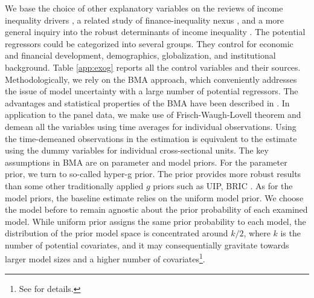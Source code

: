 \documentclass[preprint, nonatbib, 10pt]{elsarticle}
\begin{document}

We base the choice of other explanatory variables on the reviews of income inequality drivers \parencite{roineetal2009,nolan2019drivers}, a related study of finance-inequality nexus \parencite{de2017finance}, and a more general inquiry into the robust determinants of income inequality \parencite{furceri2019robust}. The potential regressors could be categorized into several groups. They control for economic and financial development, demographics, globalization, and institutional background. Table \ref{app:exog} reports all the control variables and their sources. 
%
%
Methodologically, we rely on the \ac{BMA} approach, which conveniently addresses the issue of model uncertainty with a large number of potential regressors. The advantages and statistical properties of the \ac{BMA} have been described in \textcite{Koop2003}. In application to the panel data, we make use of Frisch-Waugh-Lovell theorem and demean all the variables using time averages for individual observations. Using the time-demeaned observations in the estimation is equivalent to the estimate using the dummy variables for individual cross-sectional units. The key assumptions in \ac{BMA} are on parameter and model priors. For the parameter prior, we turn to so-called hyper-g prior. The prior provides more robust results than some other traditionally applied $g$ priors such as \ac{UIP}, \ac{BRIC} \parencite{feldkircher2012impact}. As for the model priors, the baseline estimate relies on the uniform model prior. We choose the model before to remain agnostic about the prior probability of each examined model. While uniform prior assigns the same prior probability to each model, the distribution of the prior model space is concentrated around $k/2$, where $k$ is the number of potential covariates, and it may consequentially gravitate towards larger model sizes and a higher number of covariates\footnote{See \textcite{LeySteel2009} for details.}.
\end{document}
